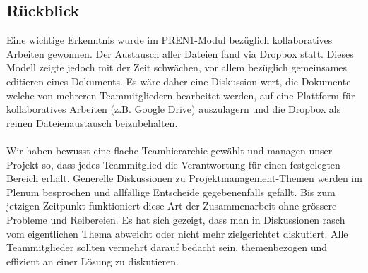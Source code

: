 \subsection{Rückblick}
Eine wichtige Erkenntnis wurde im PREN1-Modul bezüglich kollaboratives Arbeiten gewonnen. Der Austausch aller Dateien fand via Dropbox statt. Dieses Modell zeigte jedoch mit der Zeit schwächen, vor allem bezüglich gemeinsames editieren eines Dokuments. Es wäre daher eine Diskussion wert, die Dokumente welche von mehreren Teammitgliedern bearbeitet werden, auf eine Plattform für kollaboratives Arbeiten (z.B. Google Drive) auszulagern und die Dropbox als reinen Dateienaustausch beizubehalten.\\
\\
Wir haben bewusst eine flache Teamhierarchie gewählt und managen unser Projekt so, dass jedes Teammitglied die Verantwortung für einen festgelegten Bereich erhält. Generelle Diskussionen zu Projektmanagement-Themen werden im Plenum besprochen und allfällige Entscheide gegebenenfalls gefällt. Bis zum jetzigen Zeitpunkt funktioniert diese Art der Zusammenarbeit ohne grössere Probleme und Reibereien.
Es hat sich gezeigt, dass man in Diskussionen rasch vom eigentlichen Thema abweicht oder nicht mehr zielgerichtet diskutiert. Alle Teammitglieder sollten vermehrt darauf bedacht sein, themenbezogen und effizient an einer Lösung zu diskutieren.
